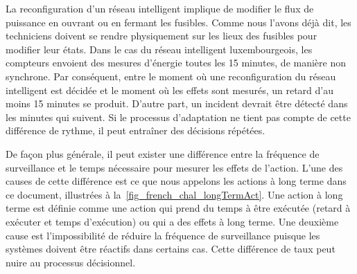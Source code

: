 %
La reconfiguration d'un réseau intelligent implique de modifier le flux de puissance en ouvrant ou en fermant les fusibles. 
Comme nous l'avons déjà dit, les techniciens doivent se rendre physiquement sur les lieux des fusibles pour modifier leur états. 
Dans le cas du réseau intelligent luxembourgeois, les compteurs envoient des mesures d'énergie toutes les 15 minutes, de manière non synchrone. 
Par conséquent, entre le moment où une reconfiguration du réseau intelligent est décidée et le moment où les effets sont mesurés, un retard d'au moins 15 minutes se produit. 
D'autre part, un incident devrait être détecté dans les minutes qui suivent. 
Si le processus d'adaptation ne tient pas compte de cette différence de rythme, il peut entraîner des décisions répétées.

%
De façon plus générale, il peut exister une différence entre la fréquence de surveillance et le temps nécessaire pour mesurer les effets de l'action. 
L'une des causes de cette différence est ce que nous appelons les actions à long terme dans ce document, illustrées à la~\cref{fig_french_chal_longTermAct}. 
Une action à long terme est définie comme une action qui prend du temps à être exécutée (retard à exécuter et temps d'exécution) ou qui a des effets à long terme.
Une deuxième cause est l'impossibilité de réduire la fréquence de surveillance puisque les systèmes doivent être réactifs dans certains cas.
Cette différence de taux peut nuire au processus décisionnel.


